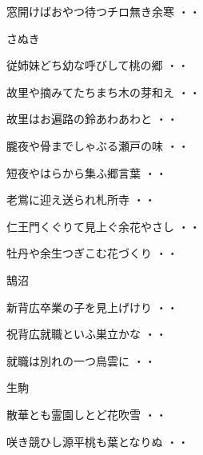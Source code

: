 \begin{shiika}窓開けばおやつ待つチロ無き余寒
\hfill{・・}\end{shiika}
\vspace{0.6cm}
さぬき
\begin{shiika}従姉妹どち幼な呼びして桃の郷
\hfill{・・}\end{shiika}
\begin{shiika}故里や摘みてたちまち木の芽和え
\hfill{・・}\end{shiika}
\begin{shiika}故里はお遍路の鈴あわあわと
\hfill{・・}\end{shiika}
\begin{shiika}朧夜や骨までしゃぶる瀬戸の味
\hfill{・・}\end{shiika}
\begin{shiika}短夜やはらから集ふ郷言葉
\hfill{・・}\end{shiika}
\begin{shiika}老鴬に迎え送られ札所寺
\hfill{・・}\end{shiika}
\begin{shiika}仁王門くぐりて見上ぐ余花やさし
\hfill{・・}\end{shiika}
\begin{shiika}牡丹や余生つぎこむ花づくり
\hfill{・・}\end{shiika}
\vspace{0.6cm}
鵠沼
\begin{shiika}新背広卒業の子を見上げけり
\hfill{・・}\end{shiika}
\begin{shiika}祝背広就職といふ巣立かな
\hfill{・・}\end{shiika}
\begin{shiika}就職は別れの一つ鳥雲に
\hfill{・・}\end{shiika}
\vspace{0.6cm}
生駒
\begin{shiika}散華とも霊園しとど花吹雪
\hfill{・・}\end{shiika}
\begin{shiika}咲き競ひし源平桃も葉となりぬ
\hfill{・・}\end{shiika}
